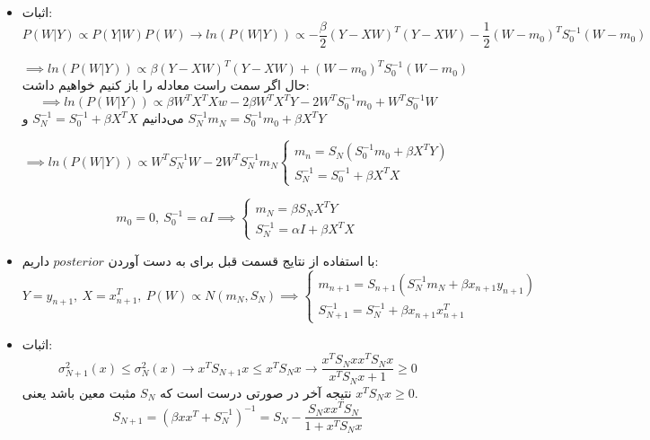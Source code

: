 
\begin{itemize}
	\item اثبات:
	 $$
	 P(W|Y) \propto P(Y|W)P(W) \rightarrow ln(P(W|Y)) \propto -\frac{\beta}{2}(Y - XW)^T(Y-XW)-\frac{1}{2}(W - m_0)^TS_0^{-1}(W- m_0)
	 $$
	 
	 $$
	 \implies ln(P(W|Y)) \propto \beta(Y - XW)^T(Y-XW) + (W - m_0)^TS_0^{-1}(W - m_0)
	 $$
	 حال اگر سمت راست معادله را باز کنیم خواهیم داشت:
	  $$
	  \implies ln(P(W|Y)) \propto \beta W^TX^TXw - 2\beta W^TX^TY - 2W^TS_0^{-1}m_0 + W^TS_0^{-1}W
	  $$
	  می‌دانیم 
	  $S_N^{-1} = S_0^{-1} + \beta X^TX$ و 
	  $
	  S_N^{-1}m_N = S_0^{-1}m_0 + \beta X^TY
	  $
	  
	  $$
	  \implies ln(P(W|Y)) \propto W^TS_N^{-1}W - 2W^TS_N^{-1}m_N \begin{cases}
	  m_n = S_N(S_0^{-1}m_0 + \beta X^TY)\\
	  S_N^{-1} = S_0^{-1} + \beta X^TX
	  \end{cases}
	  $$
	  
	  $$
	  m_0 = 0, \: S_0^{-1} = \alpha I \implies \begin{cases}
	  m_N = \beta S_NX^TY \\
	  S_N^{-1} = \alpha I + \beta X^TX
	  \end{cases}
	  $$
	  \item با استفاده از نتایج قسمت قبل برای به دست آوردن $posterior$ داریم:
	  $$
	  Y = y_{n + 1}, \: X = x_{n + 1}^T, \: P(W) \propto N(m_N, S_N) \implies \begin{cases}
	  m_{n + 1} = S_{n + 1}(S_N^{-1}m_N + \beta x_{n + 1} y_{n + 1}) \\
	  S_{N + 1}^{-1} = S_N^{-1} + \beta x_{n + 1} x_{n + 1}^T
	  \end{cases}
	  $$
	  \item 
	  اثبات:
	  $$
	  \sigma_{N + 1}^2(x) \leq \sigma_{N}^2(x) \rightarrow x^TS_{N + 1} x \leq x^TS_Nx \rightarrow \frac{x^TS_Nxx^TS_Nx}{x^TS_Nx + 1} \geq 0
	  $$
	  نتیجه آخر در صورتی درست است که $S_N$ مثبت معین باشد یعنی $x^TS_Nx \geq 0$.
	  $$
	  S_{N + 1} = (\beta xx^T + S_N^{-1})^{-1} = S_N - \frac{S_Nxx^TS_N}{1 + x^TS_Nx}
	  $$
\end{itemize}